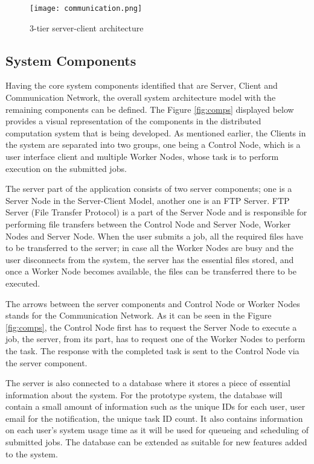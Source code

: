 \documentclass[10pt]{report}
\begin{document}
\begin{figure}[htp]
    \centering
    \texttt{[image: communication.png]}
    \caption{3-tier server-client architecture}
    \label{fig:3tier}
\end{figure}

\subsection{System Components}

Having the core system components identified that are Server, Client and Communication Network, the overall system architecture model with the remaining components can be defined. The Figure \ref{fig:comps} displayed below provides a visual representation of the components in the distributed computation system that is being developed. As mentioned earlier, the Clients in the system are separated into two groups, one being a Control Node, which is a user interface client and multiple Worker Nodes, whose task is to perform execution on the submitted jobs.
\newline

The server part of the application consists of two server components; one is a Server Node in the Server-Client Model, another one is an FTP Server. FTP Server (File Transfer Protocol) is a part of the Server Node and is responsible for performing file transfers between the Control Node and Server Node, Worker Nodes and Server Node. When the user submits a job, all the required files have to be transferred to the server; in case all the Worker Nodes are busy and the user disconnects from the system, the server has the essential files stored, and once a Worker Node becomes available, the files can be transferred there to be executed.
\newline

The arrows between the server components and Control Node or Worker Nodes stands for the Communication Network. As it can be seen in the Figure \ref{fig:comps}, the Control Node first has to request the Server Node to execute a job, the server, from its part, has to request one of the Worker Nodes to perform the task. The response with the completed task is sent to the Control Node via the server component.
\newline

The server is also connected to a database where it stores a piece of essential information about the system. For the prototype system, the database will contain a small amount of information such as the unique IDs for each user, user email for the notification, the unique task ID count. It also contains information on each user's system usage time as it will be used for queueing and scheduling of submitted jobs. The database can be extended as suitable for new features added to the system.
\newline
\end{document}
